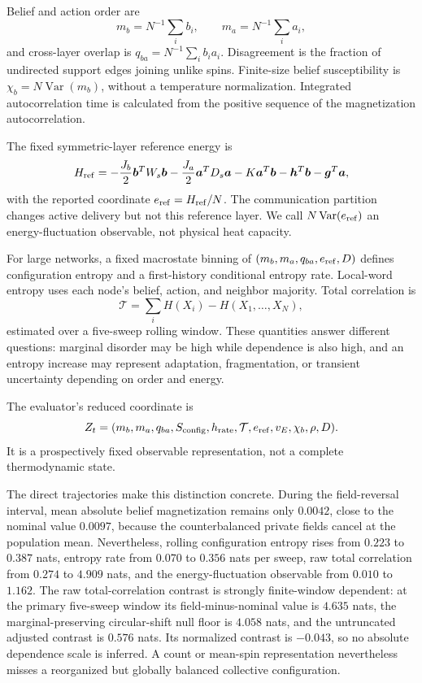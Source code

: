 \documentclass[12pt]{article}
\begin{document}
Belief and action order are
\begin{equation}
m_b=N^{-1}\sum_i b_i,\qquad m_a=N^{-1}\sum_i a_i,
\end{equation}
and cross-layer overlap is $q_{ba}=N^{-1}\sum_i b_ia_i$. Disagreement is the
fraction of undirected support edges joining unlike spins. Finite-size belief
susceptibility is $\chi_b=N\operatorname{Var}(m_b)$, without a temperature
normalization. Integrated autocorrelation time is calculated from the positive
sequence of the magnetization autocorrelation.

The fixed symmetric-layer reference energy is
\begin{equation}
H_{\rm ref}=-\frac{J_b}{2}\bm b^TW_s\bm b
-\frac{J_a}{2}\bm a^TD_s\bm a-K\bm a^T\bm b
-\bm h^T\bm b-\bm g^T\bm a,
\end{equation}
with the reported coordinate $e_{\rm ref}=H_{\rm ref}/N$. The communication
partition changes active delivery but not this reference layer. We call
$N\operatorname{Var}(e_{\rm ref})$ an energy-fluctuation observable, not
physical heat capacity.

For large networks, a fixed macrostate binning of
$(m_b,m_a,q_{ba},e_{\rm ref},D)$ defines configuration entropy and a
first-history conditional entropy rate. Local-word entropy uses each node's
belief, action, and neighbor majority. Total correlation is
\begin{equation}
\mathcal T=\sum_iH(X_i)-H(X_1,\ldots,X_N),
\end{equation}
estimated over a five-sweep rolling window. These quantities answer different
questions: marginal disorder may be high while dependence is also high, and an
entropy increase may represent adaptation, fragmentation, or transient
uncertainty depending on order and energy.

The evaluator's reduced coordinate is
\begin{equation}
Z_t=(m_b,m_a,q_{ba},S_{\rm config},h_{\rm rate},\mathcal T,
e_{\rm ref},v_E,\chi_b,\rho,D).
\end{equation}
It is a prospectively fixed observable representation, not a complete
thermodynamic state.

The direct trajectories make this distinction concrete. During the
field-reversal interval, mean absolute belief magnetization remains only
$0.0042$, close to the nominal value $0.0097$, because the counterbalanced
private fields cancel at the population mean. Nevertheless, rolling
configuration entropy rises from $0.223$ to $0.387$ nats, entropy rate from
$0.070$ to $0.356$ nats per sweep, raw total correlation from $0.274$ to $4.909$
nats, and the energy-fluctuation observable from $0.010$ to $1.162$. The raw
total-correlation contrast is strongly finite-window dependent: at the primary
five-sweep window its field-minus-nominal value is $4.635$ nats, the
marginal-preserving circular-shift null floor is $4.058$ nats, and the
untruncated adjusted contrast is $0.576$ nats. Its normalized contrast is
$-0.043$, so no absolute dependence scale is inferred. A count or mean-spin
representation nevertheless misses a reorganized but globally balanced
collective configuration.
\end{document}
